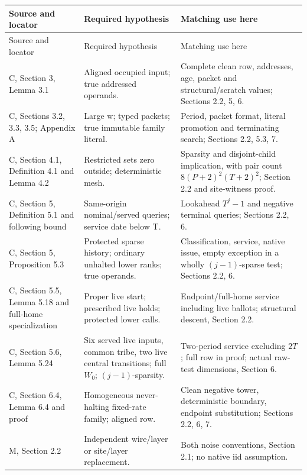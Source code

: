 \begingroup
\small
\setlength{\tabcolsep}{4pt}
\renewcommand{\arraystretch}{1.12}
\begin{longtable}{@{}>{\raggedright\arraybackslash}p{}>{\raggedright\arraybackslash}p{}>{\raggedright\arraybackslash}p{}@{}}
\toprule
Source and locator & Required hypothesis & Matching use here\\
\midrule
\endfirsthead
\toprule
Source and locator & Required hypothesis & Matching use here\\
\midrule
\endhead
\bottomrule
\endfoot
C, Section 3, Lemma 3.1 & Aligned occupied input; true addressed operands. & Complete clean row, addresses, age, packet and structural/scratch values; Sections 2.2, 5, 6.\\
C, Sections 3.2, 3.3, 3.5; Appendix A & Large w; typed packets; true immutable family literal. & Period, packet format, literal promotion and terminating search; Sections 2.2, 5.3, 7.\\
C, Section 4.1, Definition 4.1 and Lemma 4.2 & Restricted sets zero outside; deterministic mesh. & Sparsity and disjoint-child implication, with pair count $8(P+2)^2(T+2)^2$; Section 2.2 and site-witness proof.\\
C, Section 5, Definition 5.1 and following bound & Same-origin nominal/served queries; service date below T. & Lookahead $T^j-1$ and negative terminal queries; Sections 2.2, 6.\\
C, Section 5, Proposition 5.3 & Protected sparse history; ordinary unhalted lower ranks; true operands. & Classification, service, native issue, empty exception in a wholly $(j-1)$-sparse test; Sections 2.2, 6.\\
C, Section 5.5, Lemma 5.18 and full-home specialization & Proper live start; prescribed live holds; protected lower calls. & Endpoint/full-home service including live ballots; structural descent, Section 2.2.\\
C, Section 5.6, Lemma 5.24 & Six served live inputs, common tribe, two live central transitions; full $W_0$; $(j-1)$-sparsity. & Two-period service excluding $2T$; full row in proof; actual raw-test dimensions, Section 6.\\
C, Section 6.4, Lemma 6.4 and proof & Homogeneous never-halting fixed-rate family; aligned row. & Clean negative tower, deterministic boundary, endpoint substitution; Sections 2.2, 6, 7.\\
M, Section 2.2 & Independent wire/layer or site/layer replacement. & Both noise conventions, Section 2.1; no native iid assumption.\\

\end{longtable}
